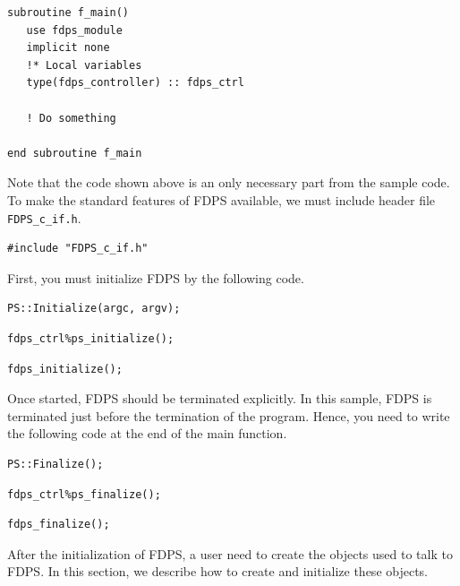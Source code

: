 \begin{lstlisting}[caption=Creation of an object of type \texttt{fdps\_controller}]
subroutine f_main()
   use fdps_module
   implicit none
   !* Local variables
   type(fdps_controller) :: fdps_ctrl
    
   ! Do something
   
end subroutine f_main    
\end{lstlisting}

Note that the code shown above is an only necessary part from the sample code. 
\endifFtn
\ifC
{}
To make the standard features of FDPS available, we must include header file  \texttt{FDPS\_c\_if.h}.
\begin{lstlisting}[caption=Including header file \texttt{FDPS\_c\_if.h}]
#include "FDPS_c_if.h"
\end{lstlisting}
\endifC


First, you must initialize FDPS by the following code.
\ifCpp
\begin{lstlisting}[caption=Initialization of FDPS]
PS::Initialize(argc, argv);
\end{lstlisting}
\endifCpp
\ifFtn
\begin{lstlisting}[caption=Initialization of FDPS]
fdps_ctrl%ps_initialize();
\end{lstlisting}
\endifFtn
\ifC
\begin{lstlisting}[caption=Initialization of FDPS]
fdps_initialize();
\end{lstlisting}
\endifC


Once started, FDPS should be terminated explicitly. In this sample, FDPS is terminated just before the termination of the program. Hence, you need to write the following code at the end of the main function.
\ifCpp
\begin{lstlisting}[caption=Termination of FDPS]
PS::Finalize();
\end{lstlisting}
\endifCpp
\ifFtn
\begin{lstlisting}[caption=Termination of FDPS]
fdps_ctrl%ps_finalize();
\end{lstlisting}
\endifFtn
\ifC
\begin{lstlisting}[caption=Termination of FDPS]
fdps_finalize();
\end{lstlisting}
\endifC


After the initialization of FDPS, a user need to create the objects used to talk to FDPS. In this section, we describe how to create and initialize these objects.

